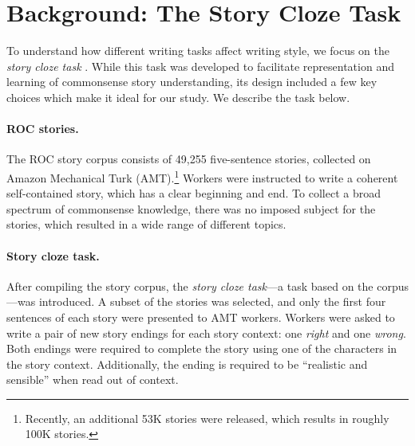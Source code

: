 \documentclass[11pt,a4paper]{article}
\newcommand{\secref}[1]{Section~\ref{ssec:#1}}
\newcommand{\isection}[2]{\section{#1}\label{ssec:#2}}
\newcommand{\com}[1]{}
\newcommand{\clinic}[1]{{\color{magenta}\textsc{[#1 --CLINIC]}}}
\begin{document}
\com{
The remainder of this paper is organized as follows. In \secref{ROC_Story} we describe the story cloze task.
We then present our model, experiments and results in Sections \ref{ssec:Model}, \ref{ssec:Experiments} and \ref{ssec:Results} respectively.
Sections \ref{ssec:Ablation} and \ref{ssec:Discussion} present a further analysis of our results  and a discussion, followed by related work and conclusions.\clinic{Omit this paragraph?}}

\isection{Background: The Story Cloze Task}{ROC_Story}
To understand how different writing tasks affect writing style, 
we focus on the \textit{story cloze task} \cite{Mostafazadeh:2016}. 
While this task was developed to facilitate representation and learning of commonsense story understanding,
its design included a few key choices which  make it ideal for our study. 
We describe the task below.




\paragraph{ROC stories.}

The ROC story corpus consists of 49,255 five-sentence 
stories, collected on Amazon Mechanical Turk (AMT).\footnote{Recently,
  an additional 53K stories were released, which results in roughly
  100K stories.}
Workers were instructed to write a coherent self-contained story, which has a clear beginning and end. 
To collect a broad spectrum of commonsense knowledge, there was no imposed subject for the stories,
which resulted in a wide range of different topics.

\paragraph{Story cloze task.}
After compiling the story corpus, the {\it story cloze task}---a task based on the corpus---was introduced.
A subset of the stories was selected, and only the first four sentences of each story were presented to AMT workers.
Workers were asked to write a pair of new story endings for each story context: one {\it right} and one {\it wrong}.
Both endings were required to complete the story using one of the characters in the story context. 
Additionally,  the ending is required to be ``realistic and sensible'' \cite{Mostafazadeh:2016} when read out of context.
\end{document}
